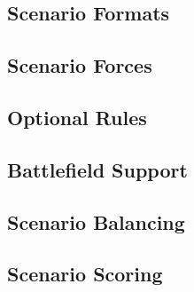 

\subsection{Scenario Formats}



\subsection{Scenario Forces}



\newpage

\subsection{Optional Rules}



\subsection{Battlefield Support}



\subsection{Scenario Balancing}



\subsection{Scenario Scoring}

